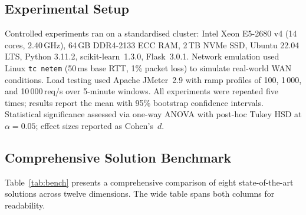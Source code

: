 \documentclass[10pt,twocolumn]{article}
\begin{document}
\subsection{Experimental Setup}

Controlled experiments ran on a standardised cluster: Intel Xeon
E5-2680 v4 (14 cores, 2.40\,GHz), 64\,GB DDR4-2133 ECC RAM,
2\,TB NVMe SSD, Ubuntu 22.04 LTS, Python 3.11.2, scikit-learn~1.3.0,
Flask~3.0.1. Network emulation used Linux \texttt{tc netem} (50\,ms
base RTT, 1\% packet loss) to simulate real-world WAN conditions.
Load testing used Apache JMeter~2.9 with ramp profiles of 100,
1\,000, and 10\,000\,req/s over 5-minute windows. All experiments
were repeated five times; results report the mean with 95\% bootstrap
confidence intervals. Statistical significance assessed via one-way
ANOVA with post-hoc Tukey HSD at $\alpha=0.05$; effect sizes
reported as Cohen's~$d$.

\subsection{Comprehensive Solution Benchmark}

Table~\ref{tab:bench} presents a comprehensive comparison of eight
state-of-the-art solutions across twelve dimensions. The wide table
spans both columns for readability.
\end{document}
